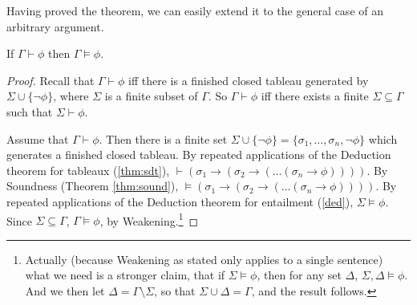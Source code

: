 Having proved the theorem, we can easily extend it to the general
case of an arbitrary argument. 

\begin{theorem}
	If $\Gamma\vdash\phi$ then $\Gamma\vDash\phi$.
\end{theorem}
\begin{proof}
	Recall that $\Gamma\vdash\phi$ iff there is a finished closed tableau generated by $\Sigma\cup\{\neg\phi\}$, where $\Sigma$ is a finite subset of $\Gamma$. So  $\Gamma\vdash\phi$ iff there exists a finite $\Sigma\subseteq\Gamma$ such that $\Sigma\vdash\phi$. 
	
	Assume that $\Gamma\vdash\phi$. Then there is a finite set $\Sigma\cup\{¬\phi\} = \{\sigma_{1},…,\sigma_{n},\neg\phi\}$ which generates a finished closed tableau. By repeated applications of the Deduction theorem for tableaux (\autoref{thm:sdt}), $\vdash (\sigma_{1} \to (\sigma_{2} \to ( … (\sigma_{n}\to\phi))))$. By Soundness (Theorem \ref{thm:sound}), $\vDash (\sigma_{1} \to (\sigma_{2} \to ( … (\sigma_{n}\to\phi))))$. By repeated applications of the Deduction theorem for entailment (\autoref{ded}), $\Sigma \vDash\phi$. Since $\Sigma\subseteq\Gamma$, $\Gamma \vDash \phi$, by Weakening.\footnote{Actually (because Weakening as stated only applies to a single sentence) what we need is a stronger claim, that if $\Sigma\vDash\phi$, then for any set $\Delta$, $\Sigma,\Delta\vDash\phi$. And we then let $\Delta=\Gamma\setminus\Sigma$, so that $\Sigma\cup\Delta=\Gamma$, and the result follows.}
\end{proof}








